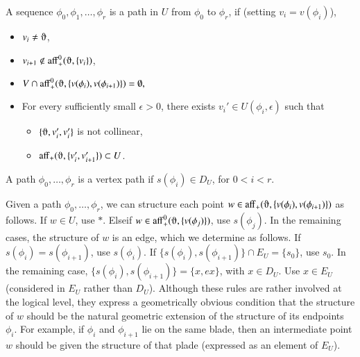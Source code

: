 \begin{definition} A sequence $\phi_0,\phi_1,\ldots,\phi_r$ is a path in $U$ from $\phi_0$ to $\phi_r$, if (setting $v_i = v(\phi_i)$),
\begin{itemize}
\item $v_i\ne \orgn$,
\item $v_{i+1}\not\in \op{aff}_+^0(\orgn,\{v_i\})$,
\item $V\cap \op{aff}_+^0(\orgn,\{v(\phi_i),v(\phi_{i+1})\}) = \emptyset,$
\item For every sufficiently small $\epsilon>0$, there exists $v_i'\in U(\phi_i,\epsilon)$ such that
   {
   \begin{itemize}
     \item $\{\orgn,v_i',v_i'\}$ is not collinear,
     \item $\op{aff}_+(\orgn,\{v_i',v_{i+1}'\})\subset U$.
   \end{itemize}
   }
\end{itemize}
\end{definition}

A path $\phi_0,\ldots,\phi_r$ is a vertex path if $s(\phi_i)\in D_U$,
for $0<i<r$.  

\begin{remark}\label{rem:structure}
Given a path $\phi_0,\ldots,\phi_r$, we can structure
each point $w\in\op{aff}_+(\orgn,\{v(\phi_i),v(\phi_{i+1})\})$ as follows.  If $w\in U$, use $*$.  Elseif $w\in \op{aff}_+^0(\orgn,\{ v(\phi_j)\})$, use
$s(\phi_j)$.  In the remaining cases, the structure of $w$ is an edge, which we determine as follows.  If $s(\phi_i)=s(\phi_{i+1})$, use $s(\phi_i)$.  
If $\{s(\phi_i),s(\phi_{i+1})\}\cap E_U = \{s_0\}$, use $s_0$.  In the remaining case, $\{s(\phi_i),s(\phi_{i+1})\} = \{x,e x\}$, with $x\in D_U$.  Use $x\in E_U$ (considered in $E_U$ rather than $D_U$).  Although these rules are rather involved at the logical level, they express a geometrically obvious condition that the structure of $w$ should be the natural geometric extension of the structure of its endpoints $\phi_i$.  For example, if $\phi_i$ and $\phi_{i+1}$ lie on the same blade, then an intermediate point $w$ should be given the structure of that plade (expressed as an element of $E_U$).
\end{remark}



